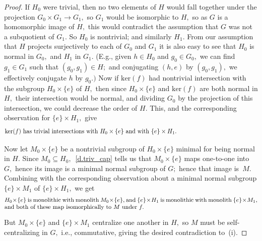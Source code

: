 \documentclass{amsart}
\numberwithin{equation}{section}
\numberwithin{theorem}{section}
\begin{document}
\begin{proof}
If $H_0$ were trivial, then
no two elements of $H$ would fall together under the
projection $G_0\times G_1\to G_1,$ so $G_1$ would be
isomorphic to $H,$ so as $G$ is a homomorphic image
of $H,$ this would contradict the assumption that $G$
was not a subquotient of $G_1.$
So $H_0$ is nontrivial; and similarly $H_1.$
From our assumption that $H$ projects surjectively to each of
$G_0$ and $G_1$ it is also easy to see
that $H_0$ is normal in $G_0,$ and $H_1$ in $G_1.$
(E.g., given $h\in H_0$ and $g_0\in G_0,$ we can find $g_1\in G_1$
such that $(g_0,g_1)\in H;$ and conjugating $(h,e)$ by $(g_0,g_1),$ we
effectively conjugate $h$ by $g_0.)$
Now if $\mathrm{ker}(f)$ had
nontrivial intersection with the subgroup $H_0\times\{e\}$ of $H,$ then
since $H_0\times\{e\}$ and $\mathrm{ker}(f)$ are both normal in $H,$
their intersection would be normal, and dividing $G_0$ by the
projection of this intersection, we could decrease the order of $H.$
This, and the corresponding observation for $\{e\}\times H_1,$ give
%
\begin{equation}\begin{minipage}[c]{35pc}\label{d.triv_cap}
$\mathrm{ker}(f)$ has trivial intersections with $H_0\times\{e\}$
and with $\{e\}\times H_1.$
\end{minipage}\end{equation}

Now let $M_0\times\{e\}$ be a nontrivial subgroup of
$H_0\times\{e\}$ minimal for being normal in $H.$
Since $M_0\subseteq H_0,$~\eqref{d.triv_cap} tells us
that $M_0\times\{e\}$ maps one-to-one into $G,$ hence its
image is a minimal normal subgroup of $G;$ hence that image is~$M.$
Combining with the corresponding observation about
a minimal normal subgroup $\{e\}\times M_1$ of
$\{e\}\times H_1,$ we get
%
\begin{equation}\begin{minipage}[c]{35pc}\label{d.M1,M2}
$H_0\times \{e\}$ is monolithic with monolith $M_0\times\{e\},$
and $\{e\}\times H_1$ is monolithic with monolith
$\{e\}\times M_1,$ and both of these map
isomorphically to $M$ under $f.$
\end{minipage}\end{equation}

But $M_0\times\{e\}$ and $\{e\}\times M_1$
centralize one another in $H,$ so $M$ must be
self-centralizing in $G,$ i.e., commutative,
giving the desired contradiction to~(i).


\end{proof}
\end{document}
